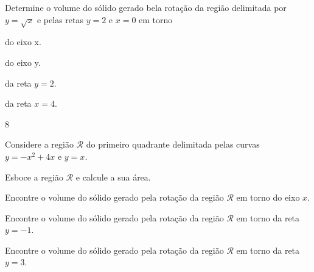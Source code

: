 \begin{exercises}
\begin{exercise}
Determine o volume do sólido gerado bela rotação da região delimitada por
$y=\sqrt{x}$ e pelas retas $y=2$ e $x=0$ em torno
\begin{alphalist}
    \item do eixo x.
    \item do eixo y.
    \item da reta $y=2$.
    \item da reta $x=4$.
\end{alphalist}
\begin{answer}
\begin{mathlist}[2]
  \item 8\pi
  \item {}
  \item {}
  \item {}
\end{mathlist}
\end{answer}
\end{exercise}

\begin{exercise}
Considere a região $\mathcal{R}$ do primeiro quadrante delimitada pelas
curvas $y=-x^2+4x$ e $y=x$.
\begin{alphalist}
  \item Esboce a região $\mathcal{R}$ e calcule a sua área.
  \item Encontre o volume do sólido gerado pela rotação da região $\mathcal{R}$ em torno do eixo $x$.
  \item Encontre o volume do sólido gerado pela rotação da região $\mathcal{R}$ em torno da reta $y=-1$.
  \item Encontre o volume do sólido gerado pela rotação da região $\mathcal{R}$ em torno da reta $y=3$.
\end{alphalist}
\begin{answer}
\begin{mathlist}[2]
  \item {}
  \item {}
  \item {}
  \item {}
\end{mathlist}
\end{answer}
\end{exercise}


\end{exercises}
